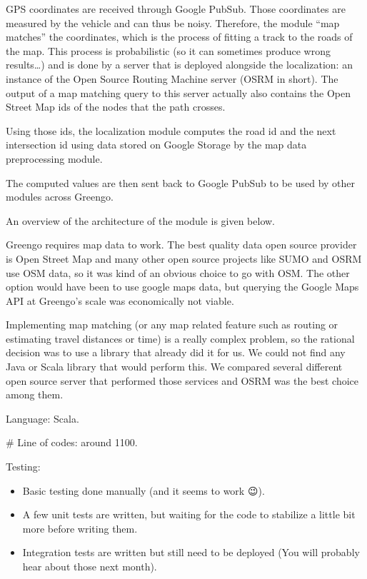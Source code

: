 \documentclass[letterpaper,10pt,english]{sphinxmanual}
\begin{document}
 GPS coordinates are received through Google PubSub. Those coordinates are measured by the vehicle and can thus be noisy. Therefore, the module “map matches” the coordinates, which is the process of fitting a track to the roads of the map. This process is probabilistic (so it can sometimes produce wrong results…) and is done by a server that is deployed alongside the localization: an instance of the Open Source Routing Machine server (OSRM in short). The output of a map matching query to this server actually also contains the Open Street Map ids of the nodes that the path crosses.

Using those ids, the localization module computes the road id and the next intersection id using data stored on Google Storage by the map data preprocessing module.

The computed values are then sent back to Google PubSub to be used by other modules across Greengo.

An overview of the architecture of the module is given below.

\begin{figure}[htbp]
\centering

\noindent{}
\end{figure}

 Greengo requires map data to work. The best quality data open source provider is Open Street Map and many other open source projects like SUMO and OSRM use OSM data, so it was kind of an obvious choice to go with OSM. The other option would have been to use google maps data, but querying the Google Maps API at Greengo’s scale was economically not viable.

Implementing map matching (or any map related feature such as routing or estimating travel distances or time) is a really complex problem, so the rational decision was to use a library that already did it for us. We could not find any Java or Scala library that would perform this. We compared several different open source server that performed those services and OSRM was the best choice among them.


Language: Scala.

\# Line of codes: around 1100.

Testing:
\begin{itemize}
\item {} 
Basic testing done manually (and it seems to work 😉).

\item {} 
A few unit tests are written, but waiting for the code to stabilize a little bit more before writing them.

\item {} 
Integration tests are written but still need to be deployed (You will probably hear about those next month).

\end{itemize}
\end{document}
